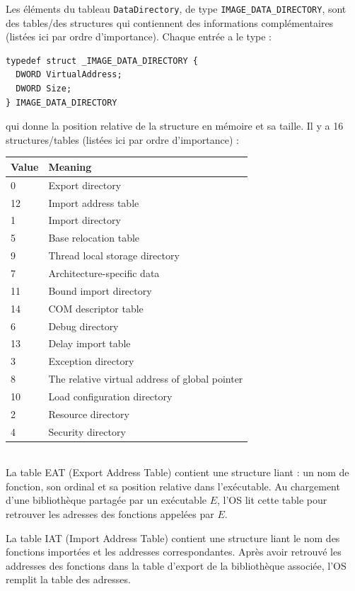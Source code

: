 \documentclass{book}
\newenvironment{commentaire}[1]{%
	\def\FrameCommand{\fboxrule=\FrameRule\fboxsep=\FrameSep \fcolorbox{yellow!50}{yellow!10}}%
	\MakeFramed {\advance\hsize-\width \FrameRestore}
	\noindent {\bf #1}\\
}%
{\endMakeFramed}
\newcommand{\code}[1]{\texttt{#1}}
\begin{document}
Les éléments du tableau \code{DataDirectory}, de type \code{IMAGE\_DATA\_DIRECTORY}, sont des  tables/des structures  qui contiennent des informations complémentaires (listées ici par ordre d'importance). Chaque entrée a le type : 

\begin{verbatim}
typedef struct _IMAGE_DATA_DIRECTORY {
  DWORD VirtualAddress;
  DWORD Size;
} IMAGE_DATA_DIRECTORY
\end{verbatim}
qui donne la position relative de la structure en mémoire et sa taille. Il y a 16 structures/tables (listées ici par ordre d'importance) :  

\bigskip
\begin{tabular}{| l | l |}
	\hline
Value	&Meaning \\
\hline
0 & Export directory\\
12&Import address table\\
1&Import directory \\
5 &Base relocation table\\
9 & Thread local storage directory\\
7 &Architecture-specific data \\
11&Bound import directory\\
14&COM descriptor table\\
6&Debug directory\\
13&Delay import table\\
3 &Exception directory \\
8 & The relative virtual address of global pointer\\
10 &Load configuration directory\\
2 & Resource directory \\
4& Security directory \\
\hline
\end{tabular}


\begin{commentaire}{En bref}
La table EAT (Export Address Table) contient une structure liant : un nom de fonction, son ordinal et sa position relative dans l'exécutable. Au chargement d'une bibliothèque partagée par un exécutable $E$, l'OS lit cette table pour retrouver les adresses des fonctions appelées par $E$.



La table IAT (Import Address Table) contient une structure liant le nom des fonctions importées et les addresses correspondantes. Après avoir retrouvé les addresses des fonctions dans la table d'export de la bibliothèque associée, l'OS remplit la table des adresses.  
\end{commentaire}
\end{document}
